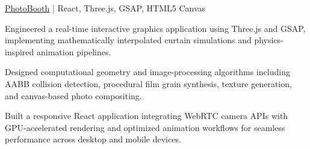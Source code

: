 \begin{cvproject}{\href{https://github.com/grvsnh/photobooth}{\uline{PhotoBooth}} | React, Three.js, GSAP, HTML5 Canvas}{}
    \item Engineered a real-time interactive graphics application using Three.js and GSAP, implementing mathematically interpolated curtain simulations and physics-inspired animation pipelines.
    \item Designed computational geometry and image-processing algorithms including AABB collision detection, procedural film grain synthesis, texture generation, and canvas-based photo compositing.
    \item Built a responsive React application integrating WebRTC camera APIs with GPU-accelerated rendering and optimized animation workflows for seamless performance across desktop and mobile devices.
\end{cvproject}